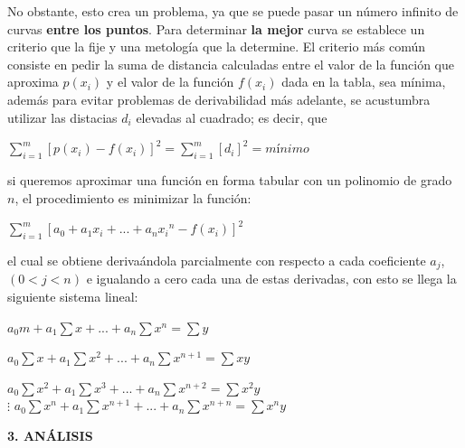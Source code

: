 \documentclass[10pt,a4paper]{article}
\begin{document}
\begin{multicols}{2}
		No obstante, esto crea un problema, ya que se puede pasar un número infinito de curvas \textbf{entre los puntos}. Para determinar \textbf{la mejor} curva se establece un criterio que la fije y una metología que la determine. El criterio más común  consiste en pedir la suma de distancia calculadas entre el valor de la función que aproxima $p(x_i)$ y el valor de la función $f(x_i)$ dada en la tabla, sea mínima, además para evitar problemas de derivabilidad más adelante, se acustumbra utilizar las distacias $d_i$ elevadas al cuadrado; es decir, que
		
		\begin{center}
			$\displaystyle\sum_{i=1}^m {[p(x_i) - f(x_i)]}^2 = \displaystyle\sum_{i=1}^m {[d_i]}^2 = mínimo$
		\end{center} 
		
		si queremos aproximar una función en forma tabular con un polinomio de grado $n$, el procedimiento es minimizar la función:
		\begin{center}
			$ \displaystyle\sum_{i=1}^m {[a_0 + a_1x_i + ... + a_n{x_i}^n - f(x_i)]}^2 $
		\end{center}
		el cual se obtiene derivaándola parcialmente con respecto a cada coeficiente $a_j$, $(0<j<n)$ e igualando a cero cada una de estas derivadas, con esto se llega la siguiente sistema lineal:
		
		\begin{center}
			$a_0 m + a_1\displaystyle\sum x + ... + a_n \displaystyle\sum x^n = \displaystyle\sum y$
			
			$a_0 \displaystyle\sum x + a_1\displaystyle\sum x^2 + ... + a_n \displaystyle\sum x^{n+1} = \displaystyle\sum xy$
			
			$a_0 \displaystyle\sum x^2 + a_1\displaystyle\sum x^3 + ... + a_n \displaystyle\sum x^{n+2} = \displaystyle\sum x^2y$\\
			$\vdots$
			$a_0 \displaystyle\sum x^n + a_1\displaystyle\sum x^{n+1} + ... + a_n \displaystyle\sum x^{n+n} = \displaystyle\sum x^ny$
			
			
			
		\end{center}
		
		\vspace*{0.2cm}
		
		\begin{center}
			{\large \bf 3. ANÁLISIS}
		\end{center}
		
		\vspace*{0.2cm}
		

\end{multicols}
\end{document}
